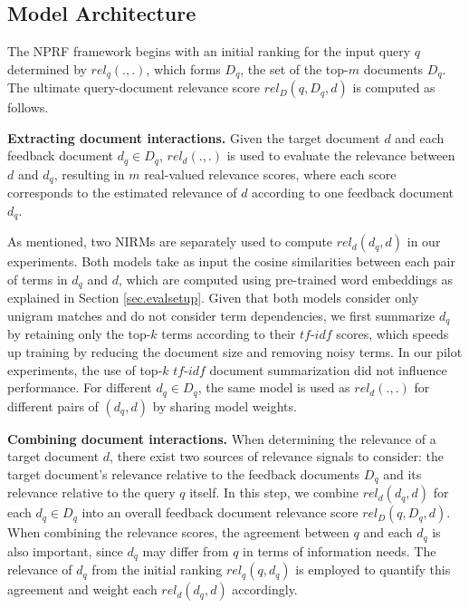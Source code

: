 \documentclass[11pt,a4paper]{article}
\newcommand{\tf}{\ensuremath{\mathit{tf}}}
\begin{document}
\vspace{\vignore}
\subsection{Model Architecture}\label{sec.architecture}
\vspace{\vignore}


The NPRF framework begins with an initial ranking for the input query $q$ determined by $\mathit{rel_q}(., .)$, which forms $D_q$, the set of the top-$m$ documents $D_q$.  
The ultimate query-document relevance score $\mathit{rel_D}(q, D_q, d)$ is computed as follows.

\textbf{Extracting document interactions.}
Given the target document $d$ and each feedback document $d_q\in D_q$,
$\mathit{rel_d}(., .)$ is used to evaluate the relevance between $d$ and $d_q$,
resulting in $m$ real-valued relevance scores, where each score corresponds to the estimated relevance of $d$ according to one feedback document $d_q$.

As mentioned, two NIRMs
are separately used to compute $\mathit{rel}_{d}(d_q, d)$ in our experiments.
Both models take as input the cosine similarities between each pair of terms in $d_q$ and $d$, which are computed using
pre-trained word embeddings as explained in Section \ref{sec.evalsetup}. Given that both models consider only unigram matches and do not consider term dependencies,
we first summarize $d_q$ by retaining only the 
top-$k$ terms according to their \tf-$idf$ scores,
which speeds up training by reducing the document size and removing noisy terms.
In our pilot experiments, the use of top-$k$ \tf-$idf$ document summarization did not influence performance.
For different $d_q\in D_q$, 
the same model is used as $\mathit{rel}_{d}(., .)$ for different pairs of $(d_q,d)$ by sharing model weights.

\textbf{Combining document interactions.} 
When determining the relevance of a target document $d$,
there exist two sources of relevance signals to consider: the target document's relevance relative to
the feedback documents $D_q$ and its relevance relative to the query $q$ itself.
In this step, we combine $\mathit{rel}_{d}(d_q, d)$ for each $d_q\in D_q$
into an overall feedback document relevance score $\mathit{rel_D}(q, D_q, d)$.
When combining the relevance scores,
the agreement between $q$ and each $d_q$ is also important, since $d_q$ may differ from $q$ in terms of information needs. 
The relevance of $d_q$ from the initial ranking $\mathit{rel}_{q}(q, d_q)$ is 
employed to quantify this agreement and weight each $\mathit{rel}_{d}(d_q, d)$ accordingly.
\end{document}
